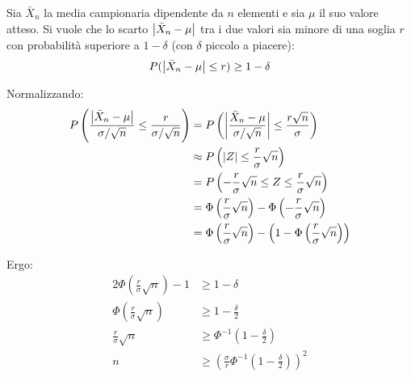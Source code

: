 Sia $\bar X_n$ la media campionaria dipendente da $n$ elementi e sia $\mu$ il suo valore atteso. Si vuole che lo scarto $\left\lvert \bar X_n - \mu \right\rvert$ tra i due valori sia minore di una soglia $r$ con probabilità superiore a $1-\delta$ (con $\delta$ piccolo a piacere):
\begin{equation*}
	P(\left\lvert \bar X_n - \mu \right\rvert \leq r) \geq 1-\delta \\
\end{equation*}

Normalizzando:
\begin{align*}
	P\left(\frac{\left\lvert \bar X_n - \mu \right\rvert}{\sigma/\sqrt{n}} \leq \frac{r}{\sigma/\sqrt{n}}\right) & = P\left(\left\lvert \frac{\bar X_n - \mu}{\sigma/\sqrt{n}} \right\rvert \leq \frac{r\sqrt{n}}{\sigma}\right)               \\
	                                                                                          & \approx P\left(\left\lvert Z \right\rvert \leq \frac{r}{\sigma}\sqrt{n}\right)                                              \\
	                                                                                          & = P\left(-\frac{r}{\sigma}\sqrt{n}\leq Z\leq \frac{r}{\sigma}\sqrt{n}\right)                             \\
	                                                                                          & = \Phi\left(\frac{r}{\sigma}\sqrt{n}\right) - \Phi\left(- \frac{r}{\sigma}\sqrt{n}\right)                \\
	                                                                                          & = \Phi\left(\frac{r}{\sigma}\sqrt{n}\right) - \left(1 - \Phi\left(\frac{r}{\sigma}\sqrt{n}\right)\right)
\end{align*}

Ergo:
\begin{align*}
	2\Phi\left(\frac{r}{\sigma}\sqrt{n}\right) - 1 & \geq 1 - \delta                                                              \\
	\Phi\left(\frac{r}{\sigma}\sqrt{n}\right)      & \geq 1 - \frac{\delta}{2}                                                    \\
	\frac{r}{\sigma}\sqrt{n}                       & \geq \Phi^{-1}\left(1-\frac{\delta}{2}\right)                                \\
	n                                              & \geq \left(\frac{\sigma}{r}\Phi^{-1}\left(1-\frac{\delta}{2}\right)\right)^2
\end{align*}

